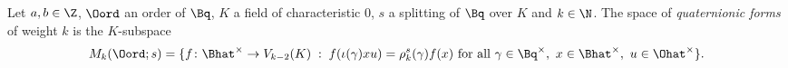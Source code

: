 Let $a,b\in\Z$, $\Oord$ an order of $\Bq$, $K$ a field of characteristic $0$, $s$ a splitting of $\Bq$ over $K$ and $k\in\N$. The space of
\emph{quaternionic forms} of weight $k$ is the $K$-subspace
\[
  M_k(\Oord;s)=\{f\colon\Bhat^\times\to V_{k-2}(K)\;:\;f(\iota(\gamma)xu)=\rho_k^s(\gamma)f(x)\text{ for all }\gamma\in\Bq^\times,\ x\in\Bhat^\times,\
  u\in\Ohat^\times\}.
\]
